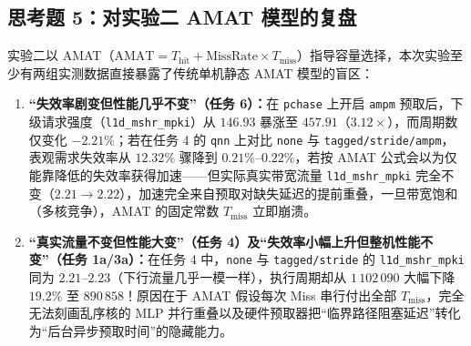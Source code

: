 \documentclass[12pt,a4paper,fontset=mac]{ctexart}
\begin{document}
\subsection*{思考题 5：对实验二 AMAT 模型的复盘}
实验二以 AMAT（$\mathrm{AMAT} = T_{\text{hit}} + \text{MissRate} \times T_{\text{miss}}$）指导容量选择，本次实验至少有两组实测数据直接暴露了传统单机静态 AMAT 模型的盲区：
\begin{enumerate}
  \item \textbf{“失效率剧变但性能几乎不变”（任务 6）：}在 \texttt{pchase} 上开启 \texttt{ampm} 预取后，下级请求强度（\texttt{l1d\_mshr\_mpki}）从 $146.93$ 暴涨至 $457.91$（$3.12\times$），而周期数仅变化 $-2.21\%$；若在任务 4 的 \texttt{qnn} 上对比 \texttt{none} 与 \texttt{tagged/stride/ampm}，表观需求失效率从 $12.32\%$ 骤降到 $0.21\%$--$0.22\%$，若按 AMAT 公式会以为仅能靠降低的失效率获得加速——但实际真实带宽流量 \texttt{l1d\_mshr\_mpki} 完全不变（$2.21 \to 2.22$），加速完全来自预取对缺失延迟的提前重叠，一旦带宽饱和（多核竞争），AMAT 的固定常数 $T_{\text{miss}}$ 立即崩溃。
  \item \textbf{“真实流量不变但性能大变”（任务 4）及“失效率小幅上升但整机性能不变”（任务 1a/3a）：}在任务 4 中，\texttt{none} 与 \texttt{tagged/stride} 的 \texttt{l1d\_mshr\_mpki} 同为 $2.21$--$2.23$（下行流量几乎一模一样），执行周期却从 $1\,102\,090$ 大幅下降 $19.2\%$ 至 $890\,858$！原因在于 AMAT 假设每次 Miss 串行付出全部 $T_{\text{miss}}$，完全无法刻画乱序核的 MLP 并行重叠以及硬件预取器把“临界路径阻塞延迟”转化为“后台异步预取时间”的隐藏能力。
\end{enumerate}
\end{document}

